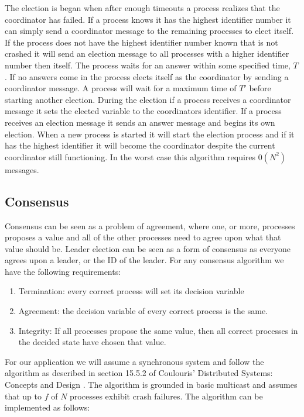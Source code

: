 \documentclass[10pt,letterpaper]{article}
\begin{document}
The election is began when after enough timeouts a process realizes that the coordinator has failed. If a process knows it has the highest identifier number it can simply send a coordinator message to the remaining processes to elect itself. If the process does not have the highest identifier number known that is not crashed it will send an election message to all processes with a higher identifier number then itself. The process waits for an answer within some specified time, $T$. If no answers come in the process elects itself as the coordinator by sending a coordinator message. A process will wait for a maximum time of $T'$ before starting another election. During the election if a process receives a coordinator message it sets the elected variable to the coordinators identifier. If a process receives an election message it sends an answer message and begins its own election. When a new process is started it will start the election process and if it has the highest identifier it will become the coordinator despite the current coordinator still functioning. In the worst case this algorithm requires $0(N^2)$ messages.

\subsection{Consensus}
Consensus can be seen as a problem of agreement, where one, or more, processes proposes a value and all of the other processes need to agree upon what that value should be. Leader election can be seen as a form of consensus as everyone agrees upon a leader, or the ID of the leader. For any consensus algorithm we have the following requirements:

\begin{enumerate}
    \item [] Termination: every correct process will set its decision variable
    \item [] Agreement: the decision variable of every correct process is the same.
    \item [] Integrity: If all processes propose the same value, then all correct processes in the decided state have chosen that value.
\end{enumerate}

For our application we will assume a synchronous system and follow the algorithm as described in section 15.5.2 of Coulouris' Distributed Systems: Concepts and Design \cite{Coulouris5}. The algorithm is grounded in basic multicast and assumes that up to $f$ of $N$ processes exhibit crash failures. The algorithm can be implemented as follows:
\end{document}
